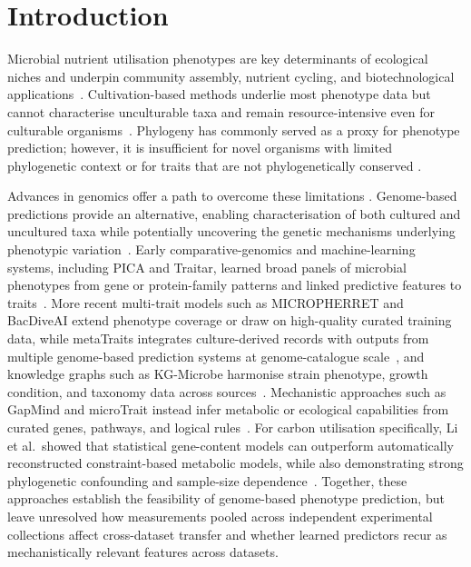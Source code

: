 
\section*{Introduction}

Microbial nutrient utilisation phenotypes are key determinants of ecological niches and underpin community assembly, nutrient cycling, and biotechnological applications~\cite{Green2008Biogeography,Malik2020Defining,Falkowski2008-bx,Lu2014-zz}.
Cultivation-based methods underlie most phenotype data but cannot characterise unculturable taxa and remain resource-intensive even for culturable organisms~\cite{Lloyd2018-ar,Barberan2017-xi}.
Phylogeny has commonly served as a proxy for phenotype prediction; however, it is insufficient for novel organisms with limited phylogenetic context or for traits that are not phylogenetically conserved \cite{Li2023-up,Goberna2016Predicting,Plata2015PhenotypicEvolution}.

Advances in genomics offer a path to overcome these limitations \cite{Quince2017Shotgun,Nayfach2021Catalog}.
Genome-based predictions provide an alternative, enabling characterisation of both cultured and uncultured taxa while potentially uncovering the genetic mechanisms underlying phenotypic variation~\cite{Ramoneda2024-yb,Hoffert2026PeriodicTable}.
Early comparative-genomics and machine-learning systems, including PICA and Traitar, learned broad panels of microbial phenotypes from gene or protein-family patterns and linked predictive features to traits~\cite{Feldbauer2015PICA,Weimann2016Traitar,Brbic2016Landscape,Karlsen2023Genotype,Lees2020Pangenome}.
More recent multi-trait models such as MICROPHERRET and BacDiveAI extend phenotype coverage or draw on high-quality curated training data, while metaTraits integrates culture-derived records with outputs from multiple genome-based prediction systems at genome-catalogue scale~\cite{Bizzotto2024MICROPHERRET,Koblitz2025Phenotype,Podlesny2026MetaTraits}, and knowledge graphs such as KG-Microbe harmonise strain phenotype, growth condition, and taxonomy data across sources~\cite{Santangelo2026KGMicrobe}.
Mechanistic approaches such as GapMind and microTrait instead infer metabolic or ecological capabilities from curated genes, pathways, and logical rules~\cite{Price2020GapMind,Price2022GapMindCarbon,Karaoz2022MicroTrait}.
For carbon utilisation specifically, Li et al.\ showed that statistical gene-content models can outperform automatically reconstructed constraint-based metabolic models, while also demonstrating strong phylogenetic confounding and sample-size dependence~\cite{Li2023-up}.
Together, these approaches establish the feasibility of genome-based phenotype prediction, but leave unresolved how measurements pooled across independent experimental collections affect cross-dataset transfer and whether learned predictors recur as mechanistically relevant features across datasets.

